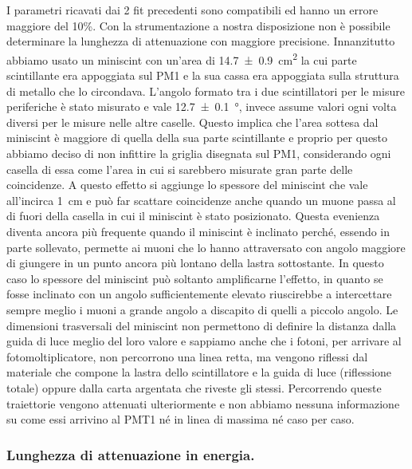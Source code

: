 I parametri ricavati dai 2 fit precedenti sono compatibili ed hanno un errore maggiore del 10\%. Con la strumentazione a nostra disposizione non è possibile determinare la lunghezza di attenuazione con maggiore precisione. Innanzitutto abbiamo usato un miniscint con un'area di \SI{14.7\pm0.9}{cm^2} la cui parte scintillante era appoggiata sul PM1 e la sua cassa  era appoggiata sulla struttura di metallo che lo circondava. L'angolo formato tra i due scintillatori per le misure periferiche è stato misurato e vale \SI{12.7\pm0.1}{\degree}, invece assume valori ogni volta diversi per le misure nelle altre caselle. Questo implica che l'area sottesa dal miniscint è maggiore di quella della sua parte scintillante e proprio per questo abbiamo deciso di non infittire la griglia disegnata sul PM1, considerando ogni casella di essa come l'area in cui si sarebbero misurate gran parte delle coincidenze. A questo effetto si aggiunge lo spessore del miniscint che vale all'incirca \SI{1}{cm} e può far scattare coincidenze anche quando un muone passa al di fuori della casella in cui il miniscint è stato posizionato. Questa evenienza diventa ancora più frequente quando il miniscint è inclinato perché, essendo in parte sollevato, permette ai muoni che lo hanno attraversato con angolo maggiore di giungere in un punto ancora più lontano della lastra sottostante. In questo caso lo spessore del miniscint può soltanto amplificarne l'effetto, in quanto se fosse inclinato con un angolo sufficientemente elevato riuscirebbe a intercettare sempre meglio  i muoni a grande angolo a discapito di quelli a piccolo angolo.
Le dimensioni trasversali del miniscint non permettono di definire la distanza dalla guida di luce meglio del loro valore e sappiamo anche che i fotoni, per arrivare al fotomoltiplicatore,  non percorrono una linea retta, ma vengono riflessi dal materiale che compone la lastra dello scintillatore e la guida di luce (riflessione totale) oppure dalla carta argentata che riveste gli stessi. Percorrendo queste traiettorie vengono attenuati ulteriormente e non abbiamo nessuna informazione su come essi arrivino al PMT1 né in linea di massima né caso per caso.

\subsubsection{Lunghezza di attenuazione in energia.}


